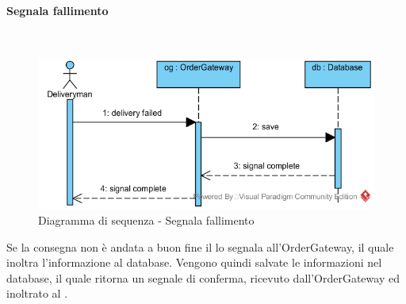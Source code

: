 \begin{samepage}
\paragraph{Segnala fallimento}\mbox{}\\
\end{samepage}
\begin{figure}[H]
	\centering
	\includegraphics[width=14cm]{../../documenti/SpecificaTecnica/diagrammi_img/sequenza/fattorino_fallimento_consegna.png}
	\caption{Diagramma di sequenza - Segnala fallimento}
\end{figure}
Se la consegna non è andata a buon fine il \Deliveryman{} lo segnala all'Order\-Gateway, il quale inoltra l'informazione al database. Vengono quindi salvate le informazioni nel database, il quale ritorna un segnale di conferma, ricevuto dall'Order\-Gateway ed inoltrato al \Deliveryman{}.

\subsubsection{\Purchasingmanager{}}

